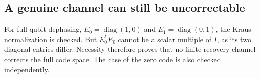 \subsection{A genuine channel can still be uncorrectable}
For full qubit dephasing, $E_0=\operatorname{diag}(1,0)$ and $E_1=\operatorname{diag}(0,1)$, the Kraus normalization is checked. But $E_0^*E_0$ cannot be a scalar multiple of $I$, as its two diagonal entries differ. Necessity therefore proves that no finite recovery channel corrects the full code space. The case of the zero code is also checked independently.

